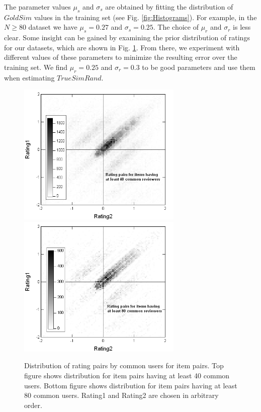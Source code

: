 \documentclass[11pt]{article}
\begin{document}
The parameter values $\mu_s$ and $\sigma_s$ are obtained by fitting the
distribution of $GoldSim$ values in the training set (see Fig.
\ref{fig:Histograms}). For example, in the $N \geq 80$ dataset we have $\mu_s =
0.27$ and $\sigma_s = 0.25$. The choice of $\mu_r$ and $\sigma_r$ is less clear.
Some insight can be gained by examining the prior distribution of ratings for 
our datasets, which are shown in Fig. \ref{fig:RatingDist}. From there, we
experiment with different values of these parameters to minimize the resulting
error over the training set. We find $\mu_r = 0.25$ and $\sigma_r = 0.3$ to be
good parameters and use them when estimating $TrueSimRand$.

\begin{figure}[!htbp]
    \centering
    \includegraphics[width=0.7\textwidth]{RatingDist_40.png}
    \includegraphics[width=0.7\textwidth]{RatingDist_80.png}
	\caption{Distribution of rating pairs by common users for item pairs.  Top
figure shows distribution for item pairs having at least 40 common users. Bottom
figure shows distribution for item pairs having at least 80 common users.
Rating1 and Rating2 are chosen in arbitrary order.}
    \label{fig:RatingDist}
\end{figure}
\end{document}
